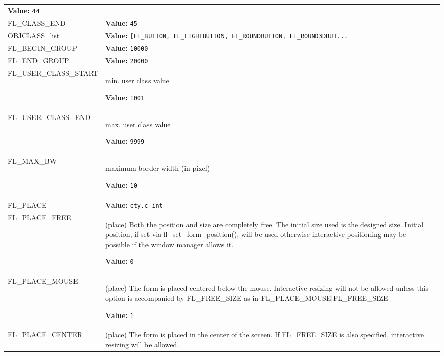 \begin{longtable}{|p{\varnamewidth}|p{\vardescrwidth}|l}
\textbf{Value:} 
{\tt 44}&\\
\cline{1-2}
\raggedright F\-L\-\_\-C\-L\-A\-S\-S\-\_\-E\-N\-D\- & \raggedright \textbf{Value:} 
{\tt 45}&\\
\cline{1-2}
\raggedright O\-B\-J\-C\-L\-A\-S\-S\-\_\-l\-i\-s\-t\- & \raggedright \textbf{Value:} 
{\tt [FL\_BUTTON, FL\_LIGHTBUTTON, FL\_ROUNDBUTTON, FL\_ROUND3DBUT\texttt{...}}&\\
\cline{1-2}
\raggedright F\-L\-\_\-B\-E\-G\-I\-N\-\_\-G\-R\-O\-U\-P\- & \raggedright \textbf{Value:} 
{\tt 10000}&\\
\cline{1-2}
\raggedright F\-L\-\_\-E\-N\-D\-\_\-G\-R\-O\-U\-P\- & \raggedright \textbf{Value:} 
{\tt 20000}&\\
\cline{1-2}
\raggedright F\-L\-\_\-U\-S\-E\-R\-\_\-C\-L\-A\-S\-S\-\_\-S\-T\-A\-R\-T\- & \raggedright min. user class value

\textbf{Value:} 
{\tt 1001}&\\
\cline{1-2}
\raggedright F\-L\-\_\-U\-S\-E\-R\-\_\-C\-L\-A\-S\-S\-\_\-E\-N\-D\- & \raggedright max. user class value

\textbf{Value:} 
{\tt 9999}&\\
\cline{1-2}
\raggedright F\-L\-\_\-M\-A\-X\-\_\-B\-W\- & \raggedright maximum border width (in pixel)

\textbf{Value:} 
{\tt 10}&\\
\cline{1-2}
\raggedright F\-L\-\_\-P\-L\-A\-C\-E\- & \raggedright \textbf{Value:} 
{\tt cty.c\_int}&\\
\cline{1-2}
\raggedright F\-L\-\_\-P\-L\-A\-C\-E\-\_\-F\-R\-E\-E\- & \raggedright (place) Both the position and size are completely free. The
initial size used is the designed size. Initial position, if set via
fl\_set\_form\_position(), will be used otherwise interactive positioning may be
possible if the window manager allows it.

\textbf{Value:} 
{\tt 0}&\\
\cline{1-2}
\raggedright F\-L\-\_\-P\-L\-A\-C\-E\-\_\-M\-O\-U\-S\-E\- & \raggedright (place) The form is placed centered below the mouse. Interactive resizing
will not be allowed unless this option is accompanied by FL\_FREE\_SIZE as in
FL\_PLACE\_MOUSE|FL\_FREE\_SIZE

\textbf{Value:} 
{\tt 1}&\\
\cline{1-2}
\raggedright F\-L\-\_\-P\-L\-A\-C\-E\-\_\-C\-E\-N\-T\-E\-R\- & \raggedright (place) The form is placed in the center of the screen. If FL\_FREE\_SIZE
is also specified, interactive resizing will be allowed.


\end{longtable}
